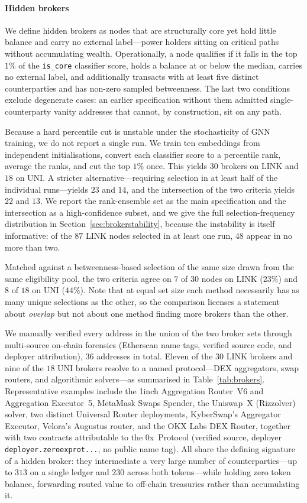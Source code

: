 \documentclass[final,5p,times]{elsarticle}
\begin{document}
\paragraph{Hidden brokers}
We define hidden brokers as nodes that are structurally core yet hold little
balance and carry no external label---power holders sitting on critical
paths without accumulating wealth. Operationally, a node qualifies if it
falls in the top $1\%$ of the \texttt{is\_core} classifier score, holds a
balance at or below the median, carries no external label, and additionally
transacts with at least five distinct counterparties and has non-zero
sampled betweenness. The last two conditions exclude degenerate cases: an
earlier specification without them admitted single-counterparty vanity
addresses that cannot, by construction, sit on any path.

Because a hard percentile cut is unstable under the stochasticity of GNN
training, we do not report a single run. We train ten embeddings from
independent initialisations, convert each classifier score to a percentile
rank, average the ranks, and cut the top $1\%$ once. This yields $30$
brokers on LINK and $18$ on UNI. A stricter alternative---requiring
selection in at least half of the individual runs---yields $23$ and $14$,
and the intersection of the two criteria yields $22$ and $13$. We report the
rank-ensemble set as the main specification and the intersection as a
high-confidence subset, and we give the full selection-frequency
distribution in Section~\ref{sec:brokerstability}, because the instability
is itself informative: of the $87$ LINK nodes selected in at least one run,
$48$ appear in no more than two.

Matched against a betweenness-based selection of the same size drawn from
the same eligibility pool, the two criteria agree on $7$ of $30$ nodes on
LINK ($23\%$) and $8$ of $18$ on UNI ($44\%$). Note that at equal set size
each method necessarily has as many unique selections as the other, so the
comparison licenses a statement about \emph{overlap} but not about one
method finding more brokers than the other.

We manually verified every address in the union of the two broker sets
through multi-source on-chain forensics (Etherscan name tags, verified
source code, and deployer attribution), $36$ addresses in total. Eleven of the $30$ LINK brokers and nine of the $18$ UNI brokers resolve to a
named protocol---DEX aggregators, swap routers, and algorithmic solvers---as
summarised in Table~\ref{tab:brokers}. Representative examples include the
1inch Aggregation Router~V6 and Aggregation Executor~5, MetaMask Swaps
Spender, the Uniswap~X (Rizzolver) solver, two distinct Universal Router
deployments, KyberSwap's Aggregator Executor, Velora's Augustus router, and
the OKX Labs DEX Router, together with two contracts attributable to the
0x~Protocol (verified source, deployer \texttt{deployer.zeroexprot...}, no
public name tag). All share the defining signature of a hidden broker: they
intermediate a very large number of counterparties---up to $313$ on a single
ledger and $230$ across both tokens---while holding zero token balance, forwarding routed value to off-chain treasuries
rather than accumulating it.
\end{document}
